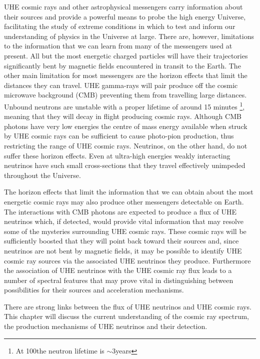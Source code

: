 UHE cosmic rays and other astrophysical messengers carry information about their sources and provide a powerful means to probe the high energy Universe, facilitating the study of extreme conditions in which to test and inform our understanding of physics in the Universe at large. There are, however, limitations to the information that we can learn from many of the messengers used at present. All but the most energetic charged particles will have their trajectories significantly  bent by magnetic fields encountered in transit to the Earth. The other main limitation for most messengers are the horizon effects that limit the distances they can travel. UHE gamma-rays will pair produce \Pelectron\Ppositron off the cosmic microwave background (CMB) preventing them from travelling large distances. Unbound neutrons are unstable with a proper lifetime of around 15 minutes \footnote{At 100\TeV the neutron lifetime is $\sim 3 $years}, meaning that they will decay in flight producing cosmic rays. Although CMB photons have very low energies the centre of mass energy available when struck by UHE cosmic rays can be sufficient to cause photo-pion production, thus restricting the range of UHE cosmic rays. Neutrinos, on the other hand, do not suffer these horizon effects. Even at ultra-high energies weakly interacting neutrinos have such small cross-sections that they travel effectively unimpeded throughout the Universe. 

The horizon effects that limit the information that we can obtain about the most energetic cosmic rays may also produce other messengers detectable on Earth. The interactions with CMB photons are expected to produce a flux of UHE neutrinos which, if detected, would provide vital information that may resolve some of the mysteries surrounding UHE cosmic rays. These cosmic rays will be sufficiently boosted that they will point back toward their sources and, since neutrinos are not bent by magnetic fields, it may be possible to identify UHE cosmic ray sources via the associated UHE neutrinos they produce. Furthermore the association of UHE neutrinos with the UHE cosmic ray flux leads to a number of spectral features that may prove vital in distinguishing between possibilities for their sources and acceleration mechanisms.

There are strong links between the flux of UHE neutrinos and UHE cosmic rays. This chapter will discuss the current understanding of the cosmic ray spectrum, the production mechanisms of UHE neutrinos and their detection.

